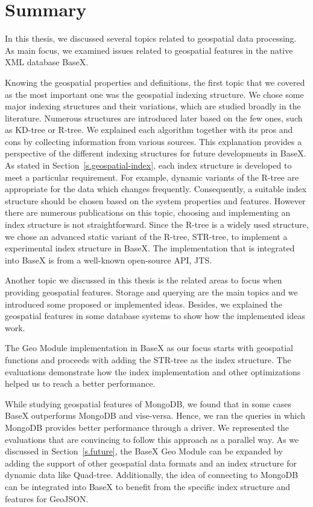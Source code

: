 \documentclass[a4paper,12pt]{article}
\begin{document}
\newpage
\section{Summary}
\label{sum}
In this thesis, we discussed several topics related to geospatial data processing. As main focus, we examined issues related to geospatial features in the native XML database BaseX. 

Knowing the geospatial properties and definitions, the first topic that we covered as the most important one was the geospatial indexing structure. We chose some major indexing structures and their variations, which are studied broadly in the literature. Numerous structures are introduced later based on the few ones, such as KD-tree or R-tree. We explained each algorithm together with its pros and cons by collecting information from various sources. This explanation provides a perspective of the different indexing structures for future developments in BaseX. As stated in Section~\ref{s.geospatial-index}, each index structure is developed to meet a particular requirement. For example, dynamic variants of the R-tree are appropriate for the data which changes frequently. Consequently, a suitable index structure should be chosen based on the system properties and features. However there are numerous publications on this topic, choosing and implementing an index structure is not straightforward. Since the R-tree is a widely used structure, we chose an advanced static variant of the R-tree, STR-tree, to implement a experimental index structure in BaseX. The implementation that is integrated into BaseX is from a well-known open-source API, JTS. 

Another topic we discussed in this thesis is the related areas to focus when providing geospatial features.
Storage and querying are the main topics and we introduced some proposed or implemented ideas. Besides, we explained the geospatial features in some database systems to show how the implemented ideas work.


The Geo Module implementation in BaseX as our focus starts with geospatial functions and proceeds with adding the STR-tree as the index structure. The evaluations demonstrate how the index implementation and other optimizations helped us to reach a better performance.


While studying geospatial features of MongoDB, we found that in some cases BaseX outperforms MongoDB and vise-versa. Hence, we ran the queries in which MongoDB provides better performance through a driver. We represented the evaluations that are convincing to follow this approach as a parallel way. 
As we discussed in Section~\ref{s.future}, the BaseX Geo Module can be expanded by adding the support of other geospatial data formats and an index structure for dynamic data like Quad-tree. Additionally, the idea of connecting to MongoDB can be integrated into BaseX to benefit from the specific index structure and features for GeoJSON.



\newpage


\newpage
\listoffigures
\newpage
\listoftables
\newpage
\lstlistoflistings
\end{document}
